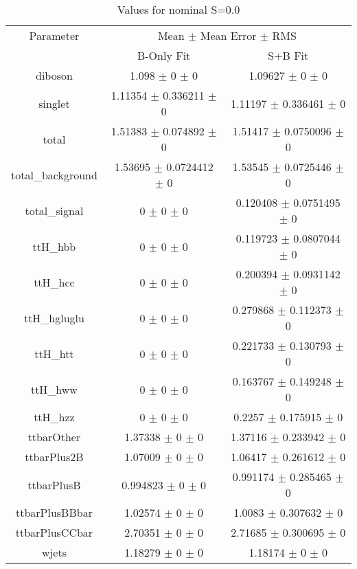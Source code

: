\begin{table}
\centering
\caption{Values for nominal S=0.0}
\begin{tabular}{ccc}
\toprule
Parameter & \multicolumn{2}{c}{Mean $\pm$ Mean Error $\pm$ RMS}\\
 & B-Only Fit & S+B Fit\\
\midrule
diboson & \num{1.098} $\pm$ \num{0} $\pm$ \num{0} & \num{1.09627} $\pm$ \num{0} $\pm$ \num{0}\\
singlet & \num{1.11354} $\pm$ \num{0.336211} $\pm$ \num{0} & \num{1.11197} $\pm$ \num{0.336461} $\pm$ \num{0}\\
total & \num{1.51383} $\pm$ \num{0.074892} $\pm$ \num{0} & \num{1.51417} $\pm$ \num{0.0750096} $\pm$ \num{0}\\
total\_background & \num{1.53695} $\pm$ \num{0.0724412} $\pm$ \num{0} & \num{1.53545} $\pm$ \num{0.0725446} $\pm$ \num{0}\\
total\_signal & \num{0} $\pm$ \num{0} $\pm$ \num{0} & \num{0.120408} $\pm$ \num{0.0751495} $\pm$ \num{0}\\
ttH\_hbb & \num{0} $\pm$ \num{0} $\pm$ \num{0} & \num{0.119723} $\pm$ \num{0.0807044} $\pm$ \num{0}\\
ttH\_hcc & \num{0} $\pm$ \num{0} $\pm$ \num{0} & \num{0.200394} $\pm$ \num{0.0931142} $\pm$ \num{0}\\
ttH\_hgluglu & \num{0} $\pm$ \num{0} $\pm$ \num{0} & \num{0.279868} $\pm$ \num{0.112373} $\pm$ \num{0}\\
ttH\_htt & \num{0} $\pm$ \num{0} $\pm$ \num{0} & \num{0.221733} $\pm$ \num{0.130793} $\pm$ \num{0}\\
ttH\_hww & \num{0} $\pm$ \num{0} $\pm$ \num{0} & \num{0.163767} $\pm$ \num{0.149248} $\pm$ \num{0}\\
ttH\_hzz & \num{0} $\pm$ \num{0} $\pm$ \num{0} & \num{0.2257} $\pm$ \num{0.175915} $\pm$ \num{0}\\
ttbarOther & \num{1.37338} $\pm$ \num{0} $\pm$ \num{0} & \num{1.37116} $\pm$ \num{0.233942} $\pm$ \num{0}\\
ttbarPlus2B & \num{1.07009} $\pm$ \num{0} $\pm$ \num{0} & \num{1.06417} $\pm$ \num{0.261612} $\pm$ \num{0}\\
ttbarPlusB & \num{0.994823} $\pm$ \num{0} $\pm$ \num{0} & \num{0.991174} $\pm$ \num{0.285465} $\pm$ \num{0}\\
ttbarPlusBBbar & \num{1.02574} $\pm$ \num{0} $\pm$ \num{0} & \num{1.0083} $\pm$ \num{0.307632} $\pm$ \num{0}\\
ttbarPlusCCbar & \num{2.70351} $\pm$ \num{0} $\pm$ \num{0} & \num{2.71685} $\pm$ \num{0.300695} $\pm$ \num{0}\\
wjets & \num{1.18279} $\pm$ \num{0} $\pm$ \num{0} & \num{1.18174} $\pm$ \num{0} $\pm$ \num{0}\\
\bottomrule
\end{tabular}
\end{table}